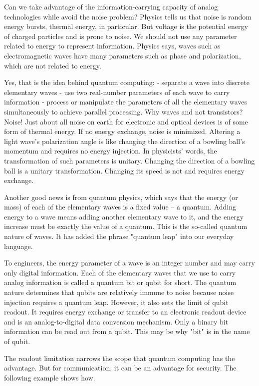 \documentclass[oneside, letter, 12pt]{book}
\begin{document}
Can we take advantage of the information-carrying capacity of analog technologies while avoid the noise problem? Physics tells us that noise is random energy bursts, thermal energy, in particular. But voltage is the potential energy of charged particles and is prone to noise. We should not use any parameter related to energy to represent information. Physics says, waves such as electromagnetic waves have many parameters such as phase and polarization, which are not related to energy.

Yes, that is the idea behind quantum computing:
- separate a wave into discrete elementary waves
- use two real-number parameters of each wave to carry information
- process or manipulate the parameters of all the elementary waves simultaneously to achieve parallel processing.
Why waves and not transistors? Noise! Just about all noise on earth for electronic and optical devices is of some form of thermal energy. If no energy exchange, noise is minimized. Altering a light wave's polarization angle is like changing the direction of a bowling ball's momentum and requires no energy injection. In physicists' words, the transformation of such parameters is unitary. Changing the direction of a bowling ball is a unitary transformation. Changing its speed is not and requires energy exchange.

Another good news is from quantum physics, which says that the energy (or mass) of each of the elementary waves is a fixed value -- a quantum. Adding energy to a wave means adding another elementary wave to it, and the energy increase must be exactly the value of a quantum. This is the so-called quantum nature of waves. It has added the phrase "quantum leap" into our everyday language.

To engineers, the energy parameter of a wave is an integer number and may carry only digital information. Each of the elementary waves that we use to carry analog information is called a quantum bit or qubit for short. The quantum nature determines that qubits are relatively immune to noise because noise injection requires a quantum leap. However, it also sets the limit of qubit readout. It requires energy exchange or transfer to an electronic readout device and is an analog-to-digital data conversion mechanism. Only a binary bit information can be read out from a qubit. This may be why "bit" is in the name of qubit.

The readout limitation narrows the scope that quantum computing has the advantage. But for communication, it can be an advantage for security. The following example shows how.
\end{document}
